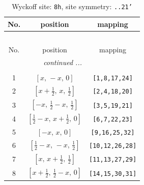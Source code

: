 \documentclass[fleqn,8pt]{jsarticle}
\begin{document}
\begin{longtable}{ccc}
\caption{Wyckoff site: {\tt 8h}, site symmetry: {\tt ..21'}}
 \\
 \hline \hline
No. & position & mapping \\ \hline \endfirsthead

\multicolumn{2}{l}{\tablename\ \thetable{}} \\
 \hline \hline
No. & position & mapping \\ \hline \endhead

 \hline \hline
\multicolumn{2}{r}{\footnotesize\it continued ...} \\ \endfoot

 \hline \hline
\multicolumn{2}{r}{} \\ \endlastfoot

1 & $\left[ x,\, - x,\, 0 \right]$ & {\tt [1,8,17,24]} \\ \hline
2 & $\left[ x + \frac{1}{2},\, x,\, \frac{1}{2} \right]$ & {\tt [2,4,18,20]} \\ \hline
3 & $\left[ - x,\, \frac{1}{2} - x,\, \frac{1}{2} \right]$ & {\tt [3,5,19,21]} \\ \hline
4 & $\left[ \frac{1}{2} - x,\, x + \frac{1}{2},\, 0 \right]$ & {\tt [6,7,22,23]} \\ \hline
5 & $\left[ - x,\, x,\, 0 \right]$ & {\tt [9,16,25,32]} \\ \hline
6 & $\left[ \frac{1}{2} - x,\, - x,\, \frac{1}{2} \right]$ & {\tt [10,12,26,28]} \\ \hline
7 & $\left[ x,\, x + \frac{1}{2},\, \frac{1}{2} \right]$ & {\tt [11,13,27,29]} \\ \hline
8 & $\left[ x + \frac{1}{2},\, \frac{1}{2} - x,\, 0 \right]$ & {\tt [14,15,30,31]} \\
\end{longtable}
\renewcommand{\arraystretch}{1.2}
\end{document}
